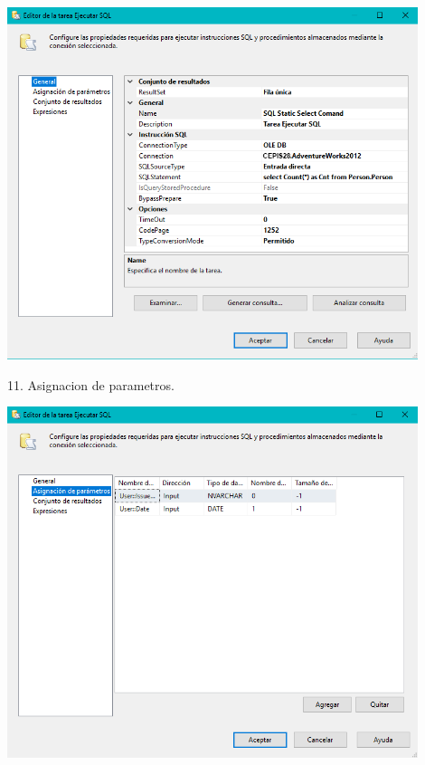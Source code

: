 	\begin{center}
	\includegraphics[width=12cm]{./Imagenes/img23}
	\end{center}	
11. Asignacion de parametros. \\
	\begin{center}
	\includegraphics[width=12cm]{./Imagenes/img24}
	\end{center}	

